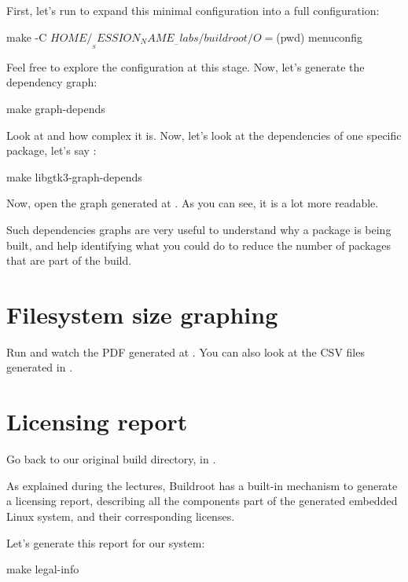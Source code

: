 First, let's run  to expand this minimal
configuration into a full configuration:

\begin{bashinput}
make -C $HOME/__SESSION_NAME__-labs/buildroot/ O=$(pwd) menuconfig
\end{bashinput}

Feel free to explore the configuration at this stage. Now, let's
generate the dependency graph:

\begin{bashinput}
make graph-depends
\end{bashinput}

Look at  and how complex it is. Now,
let's look at the dependencies of one specific package, let's say
:

\begin{bashinput}
make libgtk3-graph-depends
\end{bashinput}

Now, open the graph generated at
. As you can see, it is a lot
more readable.

Such dependencies graphs are very useful to understand why a package
is being built, and help identifying what you could do to reduce the
number of packages that are part of the build.

\section{Filesystem size graphing}

Run  and watch the PDF generated at
. You can also look at the CSV
files generated in .

\section{Licensing report}

Go back to our original build directory, in
.

As explained during the lectures, Buildroot has a built-in mechanism
to generate a licensing report, describing all the components part of
the generated embedded Linux system, and their corresponding licenses.

Let's generate this report for our system:

\begin{bashinput}
make legal-info
\end{bashinput}

